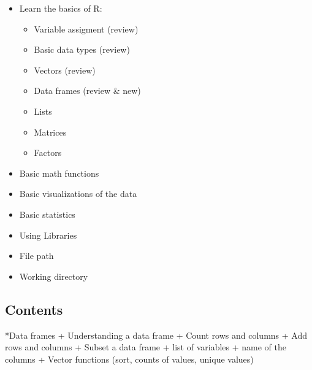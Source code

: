 \documentclass[]{book}
\providecommand{\tightlist}{%
  \setlength{\itemsep}{0pt}\setlength{\parskip}{0pt}}
\theoremstyle{definition}
\theoremstyle{definition}
\theoremstyle{definition}
\theoremstyle{remark}
\begin{document}
\begin{itemize}
\tightlist
\item
  Learn the basics of R:

  \begin{itemize}
  \tightlist
  \item
    Variable assigment (review)
  \item
    Basic data types (review)
  \item
    Vectors (review)
  \item
    Data frames (review \& new)
  \item
    Lists
  \item
    Matrices
  \item
    Factors
  \end{itemize}
\item
  Basic math functions
\item
  Basic visualizations of the data
\item
  Basic statistics
\item
  Using Libraries
\item
  File path
\item
  Working directory
\end{itemize}

\hypertarget{contents-1}{%
\subsection{Contents}\label{contents-1}}

*Data frames + Understanding a data frame + Count rows and columns + Add
rows and columns + Subset a data frame + list of variables + name of the
columns + Vector functions (sort, counts of values, unique values)
\end{document}
